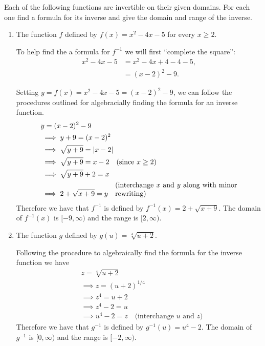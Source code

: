 \documentclass[nooutcomes]{ximera}
\begin{document}
\begin{problem}
  Each of the following functions are invertible on their given domains.
  For each one find a formula for its inverse and give the domain and range of the inverse.
  \begin{enumerate}
    \item
      The function $f$ defined by $f(x)=x^2-4x-5$ for every $x \ge 2$.
      \begin{freeResponse}
        To help find the a formula for $f^{-1}$ we will first ``complete the square'':
        \begin{align*}
          x^2-4x-5 &= x^2 - 4x + 4 - 4 - 5,\\
                   &= (x - 2)^2 - 9.
        \end{align*}
    
        Setting $y = f(x) = x^2-4x-5 = (x - 2)^2 - 9$, we can follow the procedures outlined for algebracially finding the formula for an inverse function.
        \begin{align*}
          &\mbox{} y = (x - 2)^2 - 9\\
          &\implies y + 9 = (x - 2)^2\\
          &\implies \sqrt{y + 9} = |x - 2| \\
          &\implies \sqrt{y + 9} = x - 2 \hspace{1em} \mbox{(since $x \ge 2$)}\\
          &\implies \sqrt{y + 9} + 2 = x \\
          &\implies 2 + \sqrt{x + 9} = y \hspace{1em} \mbox{\parbox[b][]{6cm}{(interchange $x$ and $y$ along with minor rewriting)}}
        \end{align*}
        Therefore we have that $f^{-1}$ is defined by $f^{-1}(x) = 2 + \sqrt{x + 9}$.
        The domain of $f^{-1}(x)$ is $[-9, \infty)$ and the range is $[2, \infty)$.
      \end{freeResponse}

    \item
      The function $g$ defined by $g(u) = \sqrt[4]{u + 2}$.
      \begin{freeResponse}
        Following the procedure to algebraically find the formula for the inverse function we have
        \begin{align*}
          &\mbox{} z = \sqrt[4]{u + 2}\\
          &\implies z = (u+2)^{1/4}\\
          &\implies z^4 = u + 2\\
          &\implies z^4 - 2 = u\\
          &\implies u^4 - 2 = z \hspace{1em} \mbox{(interchange $u$ and $z$)}
        \end{align*}
        Therefore we have that $g^{-1}$ is defined by $g^{-1}(u) = u^4 - 2$.
        The domain of $g^{-1}$ is $[0, \infty)$ and the range is $[-2, \infty)$.
      \end{freeResponse}


\end{enumerate}
\end{problem}
\end{document}
